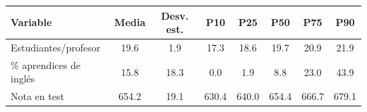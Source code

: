 
\begin{tabular}{lccccccc}
\toprule
Variable & Media & Desv. est. & P10 & P25 & P50 & P75 & P90\\
\midrule
Estudiantes/profesor & 19.6 & 1.9 & 17.3 & 18.6 & 19.7 & 20.9 & 21.9\\
\% aprendices de inglés & 15.8 & 18.3 & 0.0 & 1.9 & 8.8 & 23.0 & 43.9\\
Nota en test & 654.2 & 19.1 & 630.4 & 640.0 & 654.4 & 666.7 & 679.1\\
\bottomrule
\end{tabular}
